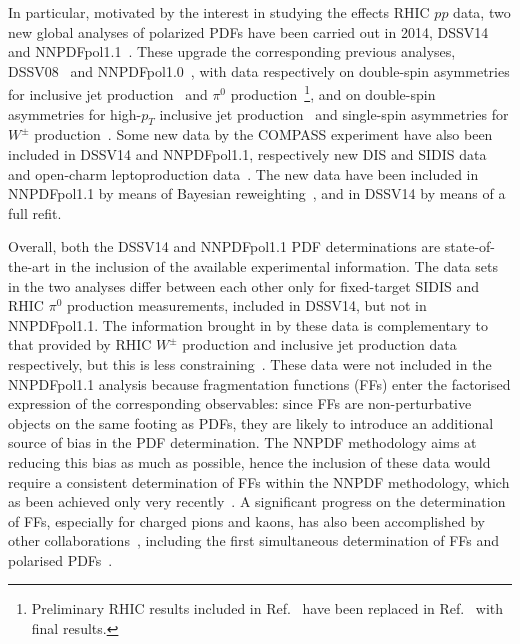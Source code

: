 In particular, motivated by the interest in studying the effects RHIC $pp$ 
data, two new global analyses of polarized PDFs have been carried out in
2014, DSSV14~\cite{deFlorian:2014yva} and NNPDFpol1.1~\cite{Nocera:2014gqa}.
%
These upgrade the corresponding previous analyses, 
DSSV08~\cite{deFlorian:2008mr} and 
NNPDFpol1.0~\cite{Ball:2013lla}, with data respectively on double-spin 
asymmetries for inclusive jet production~\cite{Adamczyk:2014ozi} 
and $\pi^0$ production~\cite{Adare:2014hsq}\footnote{Preliminary RHIC results 
included in Ref.~\cite{deFlorian:2008mr} have been replaced in
Ref.~\cite{deFlorian:2014yva} with final results.}, 
and on double-spin asymmetries for high-$p_T$ inclusive jet 
production~\cite{Adamczyk:2014ozi,Adamczyk:2012qj,Adare:2010cc} and single-spin
asymmetries for $W^\pm$ production~\cite{Adamczyk:2014xyw}.
%
Some new data by the COMPASS experiment have also been included in 
DSSV14 and NNPDFpol1.1, respectively new DIS and SIDIS 
data~\cite{Alekseev:2010hc,Alekseev:2010ub} and open-charm leptoproduction 
data~\cite{Adolph:2012ca}. 
%
The new data have been included in NNPDFpol1.1 
by means of Bayesian reweighting~\cite{Ball:2010gb},
and in DSSV14 by means of a full refit.  

Overall, both the DSSV14 and NNPDFpol1.1 PDF determinations are 
state-of-the-art in the inclusion of the available experimental information. 
%
The data sets in the two analyses differ between each other only for 
fixed-target SIDIS and RHIC $\pi^0$ production measurements, included in 
DSSV14, but not in NNPDFpol1.1. 
%
The information brought in by these data is complementary to that provided by 
RHIC $W^\pm$ production and inclusive jet production data respectively, 
but this is less constraining~\cite{Nocera:2014gqa}. 
%
These data were not included in the NNPDFpol1.1 analysis because 
fragmentation functions (FFs) enter the factorised expression of the 
corresponding observables: since FFs are non-perturbative objects on the 
same footing as PDFs, they are likely to introduce an additional source of 
bias in the PDF determination. 
%
The NNPDF methodology aims at reducing this bias as much as possible, hence 
the inclusion of these data would require a consistent determination 
of FFs within the NNPDF methodology, which as been achieved only very 
recently~\cite{Nocera:2017qgb,Bertone:2017xsf}. 
%
A significant progress on the determination of FFs, especially for charged
pions and kaons, has also been accomplished by other 
collaborations~\cite{deFlorian:2014xna,deFlorian:2017lwf,Hirai:2016loo,
Sato:2016tuz}, including the first simultaneous determination of FFs and 
polarised PDFs~\cite{Ethier:2017zbq}.


